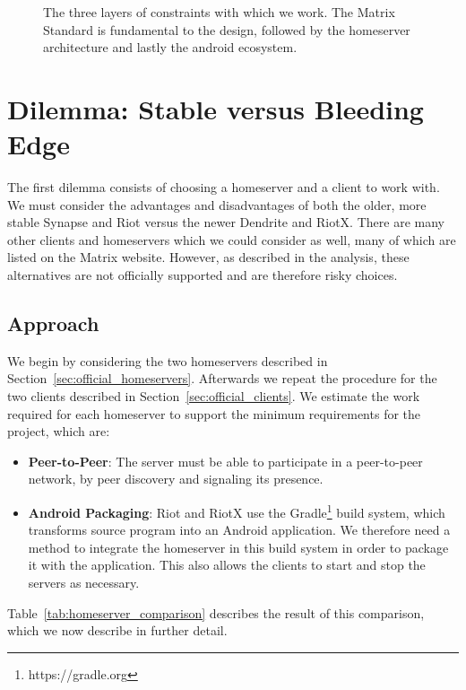 \begin{figure}
	\centering
	\resizebox{!}{!}{}
	\caption{%
		The three layers of constraints with which we work.
		The Matrix Standard is fundamental to the design, followed by the homeserver architecture and lastly the android ecosystem.
	}%
	\label{fig:design_constraints}
\end{figure}

\section{Dilemma: Stable versus Bleeding Edge}
The first dilemma consists of choosing a homeserver and a client to work with.
We must consider the advantages and disadvantages of both the older, more stable Synapse and Riot versus the newer Dendrite and RiotX.
There are many other clients and homeservers which we could consider as well, many of which are listed on the Matrix website.
However, as described in the analysis, these alternatives are not officially supported and are therefore risky choices.

\subsection{Approach}
We begin by considering the two homeservers described in Section~\ref{sec:official_homeservers}.
Afterwards we repeat the procedure for the two clients described in Section~\ref{sec:official_clients}.
We estimate the work required for each homeserver to support the minimum requirements for the project, which are:
\begin{itemize}
	\item{
	      \textbf{Peer-to-Peer}:
	      The server must be able to participate in a peer-to-peer network, by peer discovery and signaling its presence.
	      }
	\item{
	      \textbf{Android Packaging}:
	      Riot and RiotX use the Gradle\footnote{https://gradle.org} build system, which transforms source program into an Android application.
	      We therefore need a method to integrate the homeserver in this build system in order to package it with the application.
	      This also allows the clients to start and stop the servers as necessary.
	      }
\end{itemize}

Table~\ref{tab:homeserver_comparison} describes the result of this comparison, which we now describe in further detail.

